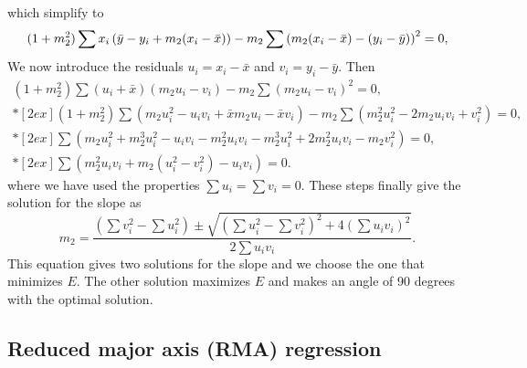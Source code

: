 which simplify to
\begin{equation}
\displaystyle (1 + m_2^2) \sum x_i \left ( \bar{y} - y_i + m_2 (x_i - \bar{x}) \right ) - m_2 \sum \left ( m_2 ( x_i - \bar{x}) - (y_i - \bar{y})\right ) ^2 = 0,\\*[2ex]
\end{equation}
We now introduce the residuals $u_i = x_i - \bar{x}$ and $v_i = y_i - \bar{y}$.  Then
$$
\begin{array}{c}
\displaystyle (1 + m_2^2) \sum (u_i + \bar{x}) \left ( m_2 u_i - v_i\right ) - m_2 \sum \left (m_2 u_i - v_i\right )^2 = 0, \\*[2ex]
\displaystyle (1 + m_2 ^2) \sum \left ( m_2 u^2_i - u_i v_i  + \bar{x} m_2 u_i - \bar{x} v_i \right ) - m_2\sum \left (m_2^2 u^2_i - 2m_2 u_iv_i + v^2_i\right ) = 0, \\*[2ex]
\displaystyle \sum \left ( m_2u^2_i + m_2^3 u^2_i - u_iv_i - m_2^2 u_iv_i - m_2^3 u^2_i + 2m_2^2 u_iv_i - m_2v^2_i \right ) = 0, \\*[2ex]
\displaystyle \sum \left ( m_2^2u_iv_i + m_2 (u^2_i - v^2_i)-u_i v_i \right ) = 0.
\end{array}
$$
where we have used the properties $\sum u_i = \sum v_i = 0$.  These steps finally give the solution for the slope as
\begin{equation}
m_2 = \frac{\left (\sum v^2_i - \sum u^2_i \right ) \pm \sqrt{\left (\sum u^2_i - \sum v^2_i \right)^2 + 4 \left(\sum u_iv_i\right)^2}}{2 \sum u_iv_i}.
\end{equation}
This equation gives two solutions for the slope and we choose the one that minimizes $E$.  The other solution maximizes $E$ and
makes an angle of 90 degrees with the optimal solution.

\subsection{Reduced major axis (RMA) regression}

